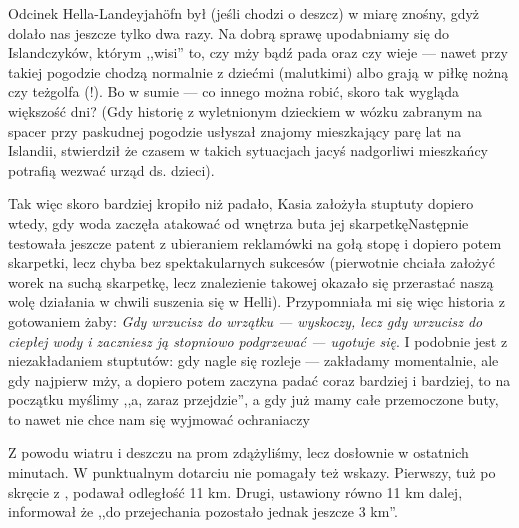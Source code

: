 

Odcinek Hella-Landeyjahöfn był (jeśli chodzi o deszcz) w miarę znośny, gdyż dolało nas jeszcze tylko dwa razy. Na dobrą sprawę upodabniamy się do Islandczyków, którym ,,wisi'' to, czy mży bądź pada oraz czy wieje --- nawet przy takiej pogodzie chodzą normalnie z dziećmi (malutkimi) albo grają w piłkę nożną czy też\textellipsis golfa (!).
Bo w sumie --- co innego można robić, skoro tak wygląda większość dni? (Gdy historię z wyletnionym dzieckiem w wózku zabranym na spacer przy paskudnej pogodzie usłyszał znajomy mieszkający parę lat na Islandii, stwierdził że czasem w takich sytuacjach jacyś nadgorliwi mieszkańcy potrafią wezwać urząd ds. dzieci).

Tak więc skoro bardziej kropiło niż padało, Kasia założyła stuptuty dopiero wtedy, gdy woda zaczęła atakować od wnętrza buta jej skarpetkę\textellipsis Następnie testowała jeszcze patent z ubieraniem reklamówki na gołą stopę i dopiero potem skarpetki, lecz chyba bez spektakularnych sukcesów (pierwotnie chciała założyć worek na suchą skarpetkę, lecz znalezienie takowej okazało się przerastać naszą wolę działania w chwili suszenia się w Helli).
Przypomniała mi się więc historia z gotowaniem żaby: \emph{Gdy wrzucisz do wrzątku --- wyskoczy, lecz gdy wrzucisz do ciepłej wody i zaczniesz ją stopniowo podgrzewać --- ugotuje się}. I podobnie jest z niezakładaniem stuptutów: gdy nagle się rozleje --- zakładamy momentalnie, ale gdy najpierw mży, a dopiero potem zaczyna padać coraz bardziej i bardziej, to na początku myślimy ,,a, zaraz przejdzie'', a gdy już mamy całe przemoczone buty, to nawet nie chce nam się wyjmować ochraniaczy\textellipsis

Z powodu wiatru i deszczu na prom zdążyliśmy, lecz dosłownie w ostatnich minutach. W punktualnym dotarciu nie pomagały też wskazy. Pierwszy, tuż po skręcie z , podawał odległość 11 km. Drugi, ustawiony równo 11 km dalej, informował że ,,do przejechania pozostało jednak jeszcze 3 km''.

